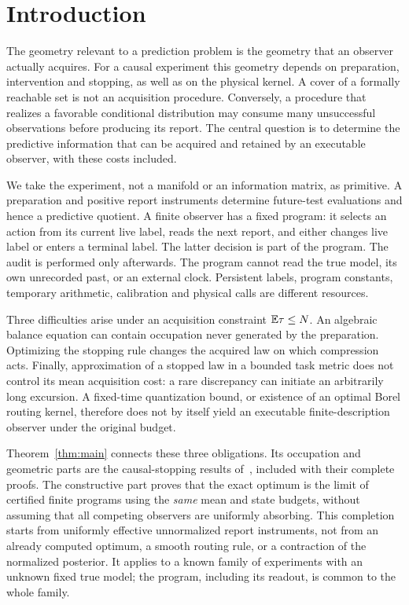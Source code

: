 \section{Introduction}
The geometry relevant to a prediction problem is the geometry that an observer actually acquires. For a causal experiment this geometry depends on preparation, intervention and stopping, as well as on the physical kernel. A cover of a formally reachable set is not an acquisition procedure. Conversely, a procedure that realizes a favorable conditional distribution may consume many unsuccessful observations before producing its report. The central question is to determine the predictive information that can be acquired and retained by an executable observer, with these costs included.

We take the experiment, not a manifold or an information matrix, as primitive. A preparation and positive report instruments determine future-test evaluations and hence a predictive quotient. A finite observer has a fixed program: it selects an action from its current live label, reads the next report, and either changes live label or enters a terminal label. The latter decision is part of the program. The audit is performed only afterwards. The program cannot read the true model, its own unrecorded past, or an external clock. Persistent labels, program constants, temporary arithmetic, calibration and physical calls are different resources.

Three difficulties arise under an acquisition constraint $\mathbb E\tau\le N$. An algebraic balance equation can contain occupation never generated by the preparation. Optimizing the stopping rule changes the acquired law on which compression acts. Finally, approximation of a stopped law in a bounded task metric does not control its mean acquisition cost: a rare discrepancy can initiate an arbitrarily long excursion. A fixed-time quantization bound, or existence of an optimal Borel routing kernel, therefore does not by itself yield an executable finite-description observer under the original budget.

Theorem~\ref{thm:main} connects these three obligations. Its occupation and geometric parts are the causal-stopping results of~\cite{GTFMean}, included with their complete proofs. The constructive part proves that the exact optimum is the limit of certified finite programs using the \emph{same} mean and state budgets, without assuming that all competing observers are uniformly absorbing. This completion starts from uniformly effective unnormalized report instruments, not from an already computed optimum, a smooth routing rule, or a contraction of the normalized posterior. It applies to a known family of experiments with an unknown fixed true model; the program, including its readout, is common to the whole family.


